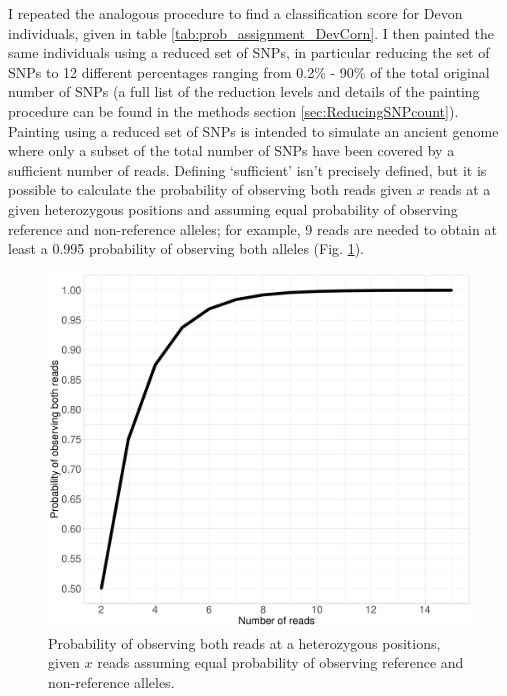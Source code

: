 I repeated the analogous procedure to find a classification score for Devon individuals, given in table \ref{tab:prob_assignment_DevCorn}. I then painted the same individuals using a reduced set of SNPs, in particular reducing the set of SNPs to 12 different percentages ranging from 0.2\% - 90\% of the total original number of SNPs (a full list of the reduction levels and details of the painting procedure can be found in the methods section \ref{sec:ReducingSNPcount}). Painting using a reduced set of SNPs is intended to simulate an ancient genome where only a subset of the total number of SNPs have been covered by a sufficient number of reads. Defining `sufficient' isn't precisely defined, but it is possible to calculate the probability of observing both reads given $x$ reads at a given heterozygous positions and assuming equal probability of observing reference and non-reference alleles; for example, 9 reads are needed to obtain at least a 0.995 probability of observing both alleles (Fig. \ref{fig:ProbabilityHetReads}).

\begin{figure}[htp]
    \centering
    \includegraphics[width=1.0\textwidth]{../images/chapter1/het_prob.pdf}
    \caption{Probability of observing both reads at a heterozygous positions, given $x$ reads assuming equal probability of observing reference and non-reference alleles.}
    \label{fig:ProbabilityHetReads}
\end{figure}


